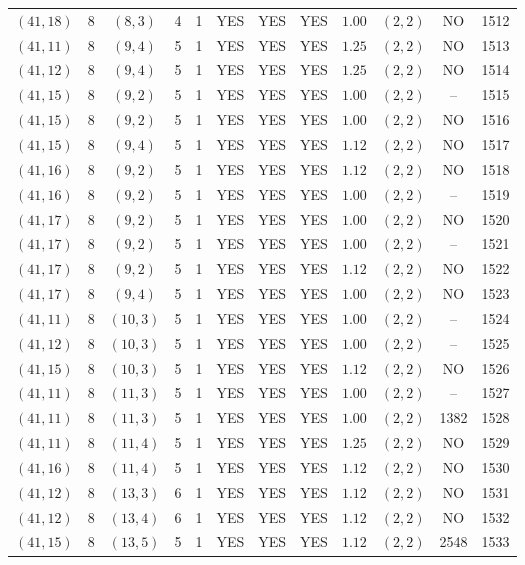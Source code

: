\begin{longtable}{|c|c|c|c|c|c|c|c|c|c|c|c|}
$(41,18)$ & 8 & $(8,3)$ & 4 & 1 & YES & YES & YES & $1.00$ & $(2,2)$ & NO & 1512\\
$(41,11)$ & 8 & $(9,4)$ & 5 & 1 & YES & YES & YES & $1.25$ & $(2,2)$ & NO & 1513\\
$(41,12)$ & 8 & $(9,4)$ & 5 & 1 & YES & YES & YES & $1.25$ & $(2,2)$ & NO & 1514\\
$(41,15)$ & 8 & $(9,2)$ & 5 & 1 & YES & YES & YES & $1.00$ & $(2,2)$ & -- & 1515\\
$(41,15)$ & 8 & $(9,2)$ & 5 & 1 & YES & YES & YES & $1.00$ & $(2,2)$ & NO & 1516\\
$(41,15)$ & 8 & $(9,4)$ & 5 & 1 & YES & YES & YES & $1.12$ & $(2,2)$ & NO & 1517\\
$(41,16)$ & 8 & $(9,2)$ & 5 & 1 & YES & YES & YES & $1.12$ & $(2,2)$ & NO & 1518\\
$(41,16)$ & 8 & $(9,2)$ & 5 & 1 & YES & YES & YES & $1.00$ & $(2,2)$ & -- & 1519\\
$(41,17)$ & 8 & $(9,2)$ & 5 & 1 & YES & YES & YES & $1.00$ & $(2,2)$ & NO & 1520\\
$(41,17)$ & 8 & $(9,2)$ & 5 & 1 & YES & YES & YES & $1.00$ & $(2,2)$ & -- & 1521\\
$(41,17)$ & 8 & $(9,2)$ & 5 & 1 & YES & YES & YES & $1.12$ & $(2,2)$ & NO & 1522\\
$(41,17)$ & 8 & $(9,4)$ & 5 & 1 & YES & YES & YES & $1.00$ & $(2,2)$ & NO & 1523\\
$(41,11)$ & 8 & $(10,3)$ & 5 & 1 & YES & YES & YES & $1.00$ & $(2,2)$ & -- & 1524\\
$(41,12)$ & 8 & $(10,3)$ & 5 & 1 & YES & YES & YES & $1.00$ & $(2,2)$ & -- & 1525\\
$(41,15)$ & 8 & $(10,3)$ & 5 & 1 & YES & YES & YES & $1.12$ & $(2,2)$ & NO & 1526\\
$(41,11)$ & 8 & $(11,3)$ & 5 & 1 & YES & YES & YES & $1.00$ & $(2,2)$ & -- & 1527\\
$(41,11)$ & 8 & $(11,3)$ & 5 & 1 & YES & YES & YES & $1.00$ & $(2,2)$ & 1382 & 1528\\
$(41,11)$ & 8 & $(11,4)$ & 5 & 1 & YES & YES & YES & $1.25$ & $(2,2)$ & NO & 1529\\
$(41,16)$ & 8 & $(11,4)$ & 5 & 1 & YES & YES & YES & $1.12$ & $(2,2)$ & NO & 1530\\
$(41,12)$ & 8 & $(13,3)$ & 6 & 1 & YES & YES & YES & $1.12$ & $(2,2)$ & NO & 1531\\
$(41,12)$ & 8 & $(13,4)$ & 6 & 1 & YES & YES & YES & $1.12$ & $(2,2)$ & NO & 1532\\
$(41,15)$ & 8 & $(13,5)$ & 5 & 1 & YES & YES & YES & $1.12$ & $(2,2)$ & 2548 & 1533\\

\end{longtable}
